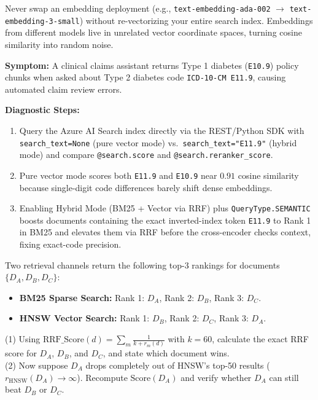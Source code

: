\begin{productionwarningbox}
Never swap an embedding deployment (e.g., \texttt{text-embedding-ada-002} $\to$ \texttt{text-embedding-3-small}) without re-vectorizing your entire search index. Embeddings from different models live in unrelated vector coordinate spaces, turning cosine similarity into random noise.
\end{productionwarningbox}

\begin{realworldbox}
\textbf{Symptom:} A clinical claims assistant returns Type 1 diabetes (\texttt{E10.9}) policy chunks when asked about Type 2 diabetes code \texttt{ICD-10-CM E11.9}, causing automated claim review errors.

\textbf{Diagnostic Steps:}
\begin{enumerate}[leftmargin=12pt]
  \item Query the Azure AI Search index directly via the REST/Python SDK with \texttt{search\_text=None} (pure vector mode) vs.\ \texttt{search\_text="E11.9"} (hybrid mode) and compare \texttt{@search.score} and \texttt{@search.reranker\_score}.
  \item Pure vector mode scores both \texttt{E11.9} and \texttt{E10.9} near $0.91$ cosine similarity because single-digit code differences barely shift dense embeddings.
  \item Enabling Hybrid Mode (BM25 + Vector via RRF) plus \texttt{QueryType.SEMANTIC} boosts documents containing the exact inverted-index token \texttt{E11.9} to Rank 1 in BM25 and elevates them via RRF before the cross-encoder checks context, fixing exact-code precision.
\end{enumerate}
\end{realworldbox}

\begin{tryityourselfbox}
Two retrieval channels return the following top-3 rankings for documents $\{D_A, D_B, D_C\}$:
\begin{itemize}[leftmargin=12pt]
  \item \textbf{BM25 Sparse Search:} Rank 1: $D_A$, Rank 2: $D_B$, Rank 3: $D_C$.
  \item \textbf{HNSW Vector Search:} Rank 1: $D_B$, Rank 2: $D_C$, Rank 3: $D_A$.
\end{itemize}
(1) Using $\text{RRF\_Score}(d) = \sum_{m} \frac{1}{k + r_m(d)}$ with $k=60$, calculate the exact RRF score for $D_A$, $D_B$, and $D_C$, and state which document wins.\\
(2) Now suppose $D_A$ drops completely out of HNSW's top-50 results ($r_{\text{HNSW}}(D_A) \to \infty$). Recompute $\text{Score}(D_A)$ and verify whether $D_A$ can still beat $D_B$ or $D_C$.
\end{tryityourselfbox}

